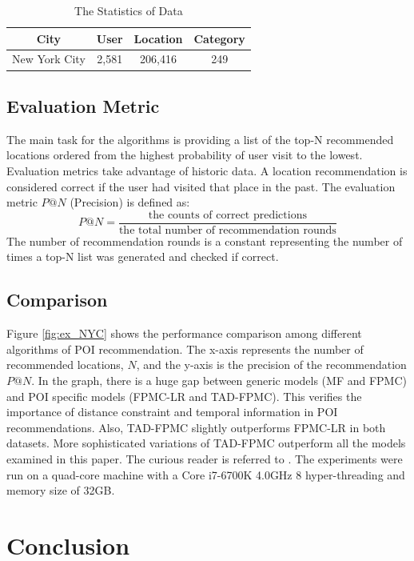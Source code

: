 \documentclass{sig-alternate}
\begin{document}
\begin{table}[ht]
\centering
\caption{The Statistics of Data \cite{Li:2017}}
\bigskip
\label{tab:stat}
\begin{tabular}{|c|c|c|c|}
        \hline
        City & User & Location & Category \\
        \hline
        New York City & 2,581 & 206,416 & 249 \\
        \hline
\end{tabular}
\end{table}

\subsection{Evaluation Metric}
\label{metic}
The main task for the algorithms is providing a list of the top-N recommended locations
ordered from the highest probability of user visit to the lowest. Evaluation metrics take advantage of historic data.  
A location recommendation is considered correct if the user had visited that place in the past. 
The evaluation metric $P@N$ (Precision) is defined as:
\begin{equation}
	P@N = \frac{\textrm{the counts of correct predictions}} {\textrm{the total number of recommendation rounds}}
\label{eq:P@N}
\end{equation}
The number of recommendation rounds is a constant representing the number of times a top-N list was 
generated and checked if correct.

\subsection{Comparison}
\label{comparison}
Figure \ref{fig:ex_NYC} shows the performance comparison among different algorithms of POI recommendation. 
The x-axis represents the number of recommended locations, $N$, and the y-axis 
is the precision of the recommendation $P@N$. In the graph, there is a huge gap 
between generic models (MF and FPMC) and POI specific models (FPMC-LR and TAD-FPMC). 
This verifies the importance of distance constraint and temporal information in POI recommendations. 
Also, TAD-FPMC slightly outperforms FPMC-LR in both datasets. More sophisticated variations of TAD-FPMC outperform 
all the models examined in this paper. The curious reader is referred to \cite{Li:2017}.
The experiments were run on a quad-core machine with a Core i7-6700K 4.0GHz 8 hyper-threading and memory size of 32GB. \cite{Li:2017} 

\section{Conclusion}
\label{sec:conclusion}
\end{document}
